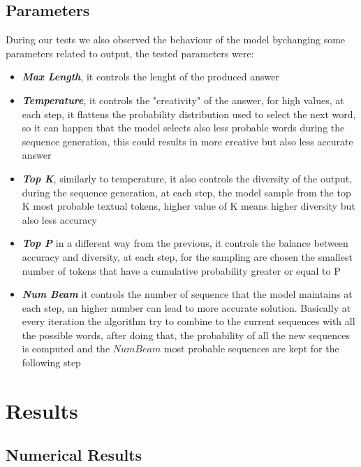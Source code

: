 \documentclass[conference]{IEEEtran}
\begin{document}
\subsection{Parameters}
During our tests we also observed the behaviour of the model bychanging some parameters related to output, the tested parameters were:
\\
\begin{itemize}
    \item \textit{\textbf{Max Length}}, it controls the lenght of the produced answer
    \item \textit{\textbf{Temperature}}, it controls the "creativity" of the answer, for high values, at each step, it flattens the probability distribution used to select the next word, so it can happen that the model selects also less probable words during the sequence generation, this could results in more creative but also less accurate answer
    \item \textit{\textbf{Top K}}, similarly to temperature, it also controls the diversity of the output, during the sequence generation, at each step, the model sample from the top K most probable textual tokens, higher value of K means higher diversity but also less accuracy
    \item \textit{\textbf{Top P}} in a different way from the previous, it controls the balance between accuracy and diversity, at each step, for the sampling are chosen the smallest number of tokens that have a cumulative probability greater or equal to P
     \item \textit{\textbf{Num Beam}} it controls the number of sequence that the model maintains at each step, an higher number can lead to more accurate solution. Basically at every iteration the algorithm try to combine to the current sequences with all the possible words, after doing that, the probability of all the new sequences is computed and the $Num Beam$ most probable sequences are kept for the following step
    
\end{itemize}

\section{Results}
\subsection{Numerical Results}
\end{document}
